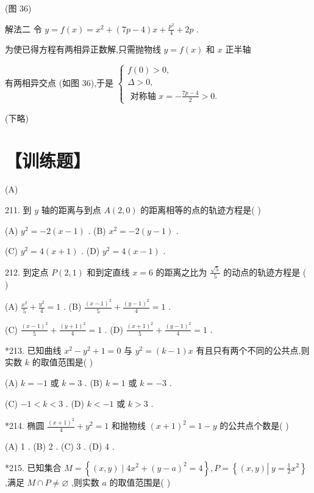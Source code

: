 \documentclass[10pt]{article}
\begin{document}
(图 36)

解法二 令 \(y = f\left( x\right)  = {x}^{2} + \left( {{7p} - 4}\right) x + \frac{{p}^{2}}{4} + {2p}\) .

为使已得方程有两相异正数解,只需抛物线 \(y = f\left( x\right)\) 和 \(x\) 正半轴

有两相异交点 (如图 36),于是 \(\left\{  \begin{array}{l} f\left( 0\right)  > 0, \\  \Delta  > 0, \\  \text{ 对称轴 }x =  - \frac{{7p} - 4}{2} > 0. \end{array}\right.\)

(下略)

\section*{【训练题】}

(A)

211. 到 \(y\) 轴的距离与到点 \(A\left( {2,0}\right)\) 的距离相等的点的轨迹方程是( )

(A) \({y}^{2} =  - 2\left( {x - 1}\right)\) . (B) \({x}^{2} =  - 2\left( {y - 1}\right)\) .

(C) \({y}^{2} = 4\left( {x + 1}\right)\) . (D) \({y}^{2} = 4\left( {x - 1}\right)\) .

212. 到定点 \(P\left( {2,1}\right)\) 和到定直线 \(x = 6\) 的距离之比为 \(\frac{\sqrt{5}}{5}\) 的动点的轨迹方程是 ( )

(A) \(\frac{{x}^{2}}{5} + \frac{{y}^{2}}{4} = 1\) . (B) \(\frac{{\left( x - 1\right) }^{2}}{5} + \frac{{\left( y - 1\right) }^{2}}{4} = 1\) .

(C) \(\frac{{\left( x - 1\right) }^{2}}{5} + \frac{{\left( y + 1\right) }^{2}}{4} = 1\) . (D) \(\frac{{\left( x + 1\right) }^{2}}{5} + \frac{{\left( y - 1\right) }^{2}}{4} = 1\) .

*213. 已知曲线 \({x}^{2} - {y}^{2} + 1 = 0\) 与 \({y}^{2} = \left( {k - 1}\right) x\) 有且只有两个不同的公共点,则实数 \(k\) 的取值范围是( )

(A) \(k =  - 1\) 或 \(k = 3\) . (B) \(k = 1\) 或 \(k =  - 3\) .

(C) \(- 1 < k < 3\) . (D) \(k <  - 1\) 或 \(k > 3\) .

*214. 椭圆 \(\frac{{\left( x + 1\right) }^{2}}{4} + {y}^{2} = 1\) 和抛物线 \({\left( x + 1\right) }^{2} = 1 - y\) 的公共点个数是( )

(A) 1 . (B) 2 . (C) 3 . (D) 4 .

*215. 已知集合 \(M = \left\{  {\left( {x,y}\right)  \mid  4{x}^{2} + {\left( y - a\right) }^{2} = 4}\right\}  ,P = \left\{  {\left( {x,y}\right) \left| {\;y = \frac{1}{2}{x}^{2}}\right. }\right\}\) ,满足 \(M \cap  P \neq  \varnothing\) ,则实数 \(a\) 的取值范围是( )
\end{document}
